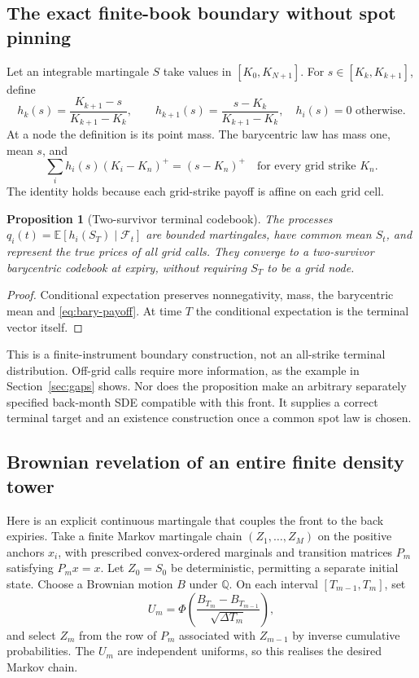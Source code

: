 \documentclass[11pt,a4paper]{article}
\numberwithin{equation}{section}
\newtheorem{proposition}[theorem]{Proposition}
\theoremstyle{definition}\newtheorem{definition}[theorem]{Definition}
\theoremstyle{remark}\newtheorem{remark}[theorem]{Remark}
\newcommand{\Q}{\mathbb Q}\newcommand{\Pp}{\mathbb P}
\newcommand{\E}{\mathbb E}\newcommand{\R}{\mathbb R}
\newcommand{\F}{\mathcal F}\newcommand{\G}{\mathcal G}
\begin{document}
\subsection{The exact finite-book boundary without spot pinning}
Let an integrable martingale $S$ take values in $[K_0,K_{N+1}]$. For $s\in[K_k,K_{k+1}]$, define
\begin{equation}
 h_k(s)=\frac{K_{k+1}-s}{K_{k+1}-K_k},\qquad
 h_{k+1}(s)=\frac{s-K_k}{K_{k+1}-K_k},
 \quad h_i(s)=0\text{ otherwise}.
 \label{eq:barycentric}
\end{equation}
At a node the definition is its point mass. The barycentric law has mass one, mean $s$, and
\begin{equation}
 \sum_i h_i(s)(K_i-K_n)^+=(s-K_n)^+
 \quad\text{for every grid strike }K_n.
 \label{eq:bary-payoff}
\end{equation}
The identity holds because each grid-strike payoff is affine on each grid cell.

\begin{proposition}[Two-survivor terminal codebook]
The processes $q_i(t)=\E[h_i(S_T)\mid\F_t]$ are bounded martingales, have common mean $S_t$, and represent the true prices of all grid calls. They converge to a two-survivor barycentric codebook at expiry, without requiring $S_T$ to be a grid node.
\end{proposition}
\begin{proof}
Conditional expectation preserves nonnegativity, mass, the barycentric mean and \eqref{eq:bary-payoff}. At time $T$ the conditional expectation is the terminal vector itself.
\end{proof}
This is a finite-instrument boundary construction, not an all-strike terminal distribution. Off-grid calls require more information, as the example in Section~\ref{sec:gaps} shows. Nor does the proposition make an arbitrary separately specified back-month SDE compatible with this front. It supplies a correct terminal target and an existence construction once a common spot law is chosen.

\subsection{Brownian revelation of an entire finite density tower}
\label{sec:revelation}
Here is an explicit continuous martingale that couples the front to the back expiries. Take a finite Markov martingale chain $(Z_1,\ldots,Z_M)$ on the positive anchors $x_i$, with prescribed convex-ordered marginals and transition matrices $P_m$ satisfying $P_mx=x$. Let $Z_0=S_0$ be deterministic, permitting a separate initial state. Choose a Brownian motion $B$ under $\Q$. On each interval $[T_{m-1},T_m]$, set
\[
 U_m=\Phi\left(\frac{B_{T_m}-B_{T_{m-1}}}{\sqrt{\Delta T_m}}\right),
\]
and select $Z_m$ from the row of $P_m$ associated with $Z_{m-1}$ by inverse cumulative probabilities. The $U_m$ are independent uniforms, so this realises the desired Markov chain.
\end{document}
